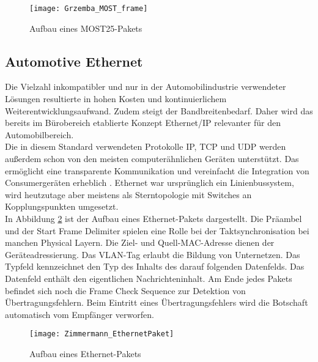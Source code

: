\begin{figure}[H]
\centering
\texttt{[image: Grzemba\_MOST\_frame]}
\label{fig:MOST-frame}
\caption{Aufbau eines \acs{MOST}25-Pakets}
\end{figure}


\subsection{Automotive Ethernet}
Die Vielzahl inkompatibler und nur in der Automobilindustrie verwendeter Lösungen resultierte in hohen Kosten und kontinuierlichem Weiterentwicklungsaufwand. Zudem steigt der Bandbreitenbedarf. Daher wird das bereits im Bürobereich etablierte Konzept Ethernet/IP relevanter für den Automobilbereich. \cite[138]{Zimmermann.2014}\\
Die in diesem Standard verwendeten Protokolle \ac{IP}, \ac{TCP} und \ac{UDP} werden außerdem schon von den meisten computerähnlichen Geräten unterstützt. Das ermöglicht eine transparente Kommunikation und vereinfacht die Integration von Consumergeräten erheblich \cite{Zimmermann.2014}. Ethernet war ursprünglich ein Linienbussystem, wird heutzutage aber meistens als Sterntopologie mit Switches an Kopplungspunkten umgesetzt. \\
In Abbildung \ref{fig:EthernetPaket} ist der Aufbau eines Ethernet-Pakets dargestellt. 
Die Präambel und der Start Frame Delimiter spielen eine Rolle bei der Taktsynchronisation bei manchen Physical Layern. Die Ziel- und Quell-MAC-Adresse dienen der Geräteadressierung. Das VLAN-Tag erlaubt die Bildung von Unternetzen. Das Typfeld kennzeichnet den Typ des Inhalts des darauf folgenden Datenfelds. Das Datenfeld enthält den eigentlichen Nachrichteninhalt. Am Ende jedes Pakets befindet sich noch die Frame Check Sequence zur Detektion von Übertragungsfehlern. Beim Eintritt eines Übertragungsfehlers wird die Botschaft automatisch vom Empfänger verworfen. \cite[140]{Zimmermann.2014}\\

\begin{figure}[H]
\centering
\texttt{[image: Zimmermann\_EthernetPaket]}
\label{fig:EthernetPaket}
\caption{Aufbau eines Ethernet-Pakets}
\end{figure}



